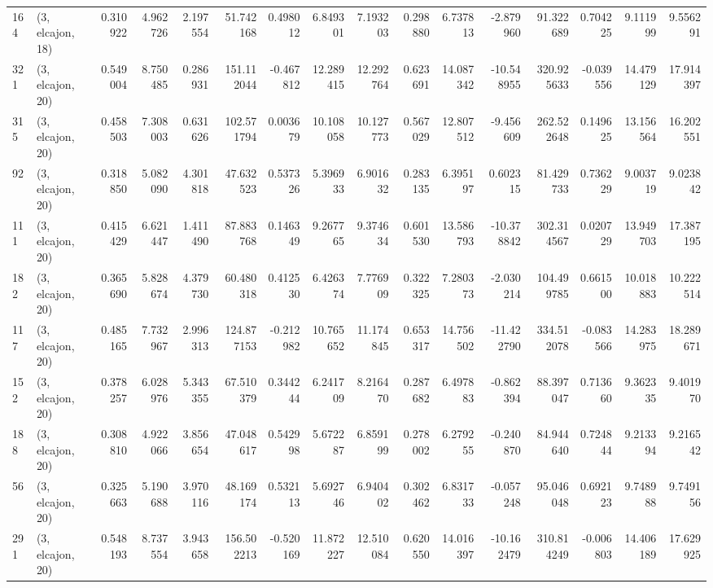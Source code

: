 \begin{tabular}{llrrrrrrrrrrrrrr}
164 &  (3, elcajon, 18) &   0.310922 &   4.962726 &   2.197554 &    51.742168 &   0.498012 &   6.849301 &   7.193203 &  0.298880 &   6.737813 &  -2.879960 &    91.322689 &  0.704225 &   9.111999 &   9.556291 \\
321 &  (3, elcajon, 20) &   0.549004 &   8.750485 &   0.286931 &   151.112044 &  -0.467812 &  12.289415 &  12.292764 &  0.623691 &  14.087342 & -10.548955 &   320.925633 & -0.039556 &  14.479129 &  17.914397 \\
315 &  (3, elcajon, 20) &   0.458503 &   7.308003 &   0.631626 &   102.571794 &   0.003679 &  10.108058 &  10.127773 &  0.567029 &  12.807512 &  -9.456609 &   262.522648 &  0.149625 &  13.156564 &  16.202551 \\
92  &  (3, elcajon, 20) &   0.318850 &   5.082090 &   4.301818 &    47.632523 &   0.537326 &   5.396933 &   6.901632 &  0.283135 &   6.395197 &   0.602315 &    81.429733 &  0.736229 &   9.003719 &   9.023842 \\
111 &  (3, elcajon, 20) &   0.415429 &   6.621447 &   1.411490 &    87.883768 &   0.146349 &   9.267765 &   9.374634 &  0.601530 &  13.586793 & -10.378842 &   302.314567 &  0.020729 &  13.949703 &  17.387195 \\
182 &  (3, elcajon, 20) &   0.365690 &   5.828674 &   4.379730 &    60.480318 &   0.412530 &   6.426374 &   7.776909 &  0.322325 &   7.280373 &  -2.030214 &   104.499785 &  0.661500 &  10.018883 &  10.222514 \\
117 &  (3, elcajon, 20) &   0.485165 &   7.732967 &   2.996313 &   124.877153 &  -0.212982 &  10.765652 &  11.174845 &  0.653317 &  14.756502 & -11.422790 &   334.512078 & -0.083566 &  14.283975 &  18.289671 \\
152 &  (3, elcajon, 20) &   0.378257 &   6.028976 &   5.343355 &    67.510379 &   0.344244 &   6.241709 &   8.216470 &  0.287682 &   6.497883 &  -0.862394 &    88.397047 &  0.713660 &   9.362335 &   9.401970 \\
188 &  (3, elcajon, 20) &   0.308810 &   4.922066 &   3.856654 &    47.048617 &   0.542998 &   5.672287 &   6.859199 &  0.278002 &   6.279255 &  -0.240870 &    84.944640 &  0.724844 &   9.213394 &   9.216542 \\
56  &  (3, elcajon, 20) &   0.325663 &   5.190688 &   3.970116 &    48.169174 &   0.532113 &   5.692746 &   6.940402 &  0.302462 &   6.831733 &  -0.057248 &    95.046048 &  0.692123 &   9.748988 &   9.749156 \\
291 &  (3, elcajon, 20) &   0.548193 &   8.737554 &   3.943658 &   156.502213 &  -0.520169 &  11.872227 &  12.510084 &  0.620550 &  14.016397 & -10.162479 &   310.814249 & -0.006803 &  14.406189 &  17.629925 \\

\end{tabular}

